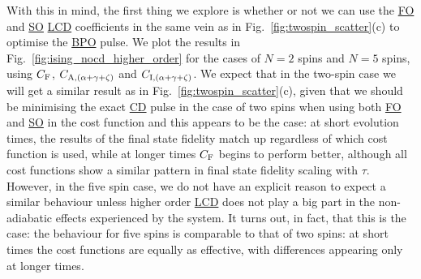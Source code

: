 \documentclass[a4paper,oneside,11pt]{book}
\newcommand{\acrref}[1]{\hyperref[acr:#1]{#1}}
\begin{document}
With this in mind, the first thing we explore is whether or not we can use the \acrref{FO} and \acrref{SO} \acrref{LCD} coefficients in the same vein as in Fig.~\ref{fig:twospin_scatter}(c) to optimise the \acrref{BPO} pulse. We plot the results in Fig.~\ref{fig:ising_nocd_higher_order} for the cases of $N=2$ spins and $N=5$ spins, using $C_{\rm F}$, $C_{\rm A, (\alpha + \gamma +\zeta)}$ and $C_{\rm I, (\alpha + \gamma +\zeta)}$. We expect that in the two-spin case we will get a similar result as in Fig.~\ref{fig:twospin_scatter}(c), given that we should be minimising the exact \acrref{CD} pulse in the case of two spins when using both \acrref{FO} and \acrref{SO} in the cost function and this appears to be the case: at short evolution times, the results of the final state fidelity match up regardless of which cost function is used, while at longer times $C_{\rm F}$ begins to perform better, although all cost functions show a similar pattern in final state fidelity scaling with $\tau$. However, in the five spin case, we do not have an explicit reason to expect a similar behaviour unless higher order \acrref{LCD} does not play a big part in the non-adiabatic effects experienced by the system. It turns out, in fact, that this is the case: the behaviour for five spins is comparable to that of two spins: at short times the cost functions are equally as effective, with differences appearing only at longer times. 
\end{document}
